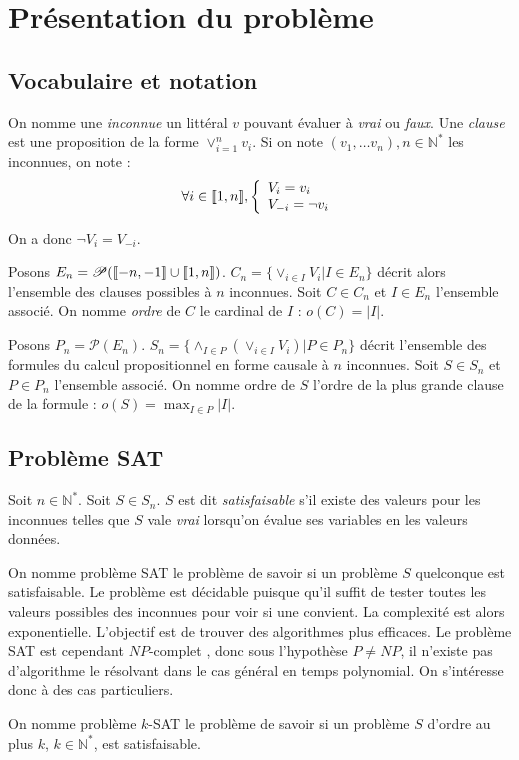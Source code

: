 \section{Présentation du problème}
\subsection{Vocabulaire et notation}
On nomme une \emph{inconnue} un littéral $v$ pouvant évaluer à \emph{vrai} ou
\emph{faux}. Une \emph{clause} est une proposition de la forme $\vee_{i=1}^n v_i$.
Si on note $(v_1,\ldots v_n), n\in\mathbb{N}^*$ les inconnues, on note :
    \[ \forall i\in\llbracket 1, n \rrbracket, \left\{\begin{array}{l}
            V_i = v_i \\
            V_{-i} = \neg v_i
       \end{array}\right.
     \]

On a donc $\neg V_i = V_{-i}$.

Posons $E_n = \mathscr{P}(\llbracket -n, -1 \rrbracket\cup\llbracket 1, n \rrbracket)$. $C_n = \{\vee_{i\in I} V_i | I\in E_n\}$
décrit alors l'ensemble des clauses possibles à $n$ inconnues. Soit $C\in C_n$
et $I\in E_n$ l'ensemble associé. On nomme \emph{ordre} de $C$ le cardinal de
$I$ : $o(C) = |I|$.

Posons $P_n = \mathscr{P}(E_n)$. $S_n = \{\wedge_{I\in P} (\vee_{i\in I} V_i) | P\in P_n\}$
décrit l'ensemble des formules du calcul propositionnel en forme causale à $n$
inconnues. Soit $S\in S_n$ et $P\in P_n$ l'ensemble associé. On nomme ordre de
$S$ l'ordre de la plus grande clause de la formule : $o(S) = \max_{I\in P} |I|$.

\subsection{Problème SAT}
Soit $n\in\mathbb{N}^*$. Soit $S\in S_n$. $S$ est dit \emph{satisfaisable} s'il
existe des valeurs pour les inconnues telles que $S$ vale \emph{vrai} lorsqu'on
évalue ses variables en les valeurs données.

On nomme problème SAT le problème de savoir si un problème $S$ quelconque est
satisfaisable. Le problème est décidable puisque qu'il suffit de tester toutes
les valeurs possibles des inconnues pour voir si une convient. La complexité
est alors exponentielle. L'objectif est de trouver des algorithmes plus
efficaces. Le problème SAT est cependant $NP$-complet \cite{cook71}, donc
sous l'hypothèse $P\neq NP$, il n'existe pas d'algorithme le résolvant dans le
cas général en temps polynomial. On s'intéresse donc à des cas particuliers.

On nomme problème $k$-SAT le problème de savoir si un problème $S$ d'ordre au
plus $k$, $k\in\mathbb{N}^*$, est satisfaisable.




